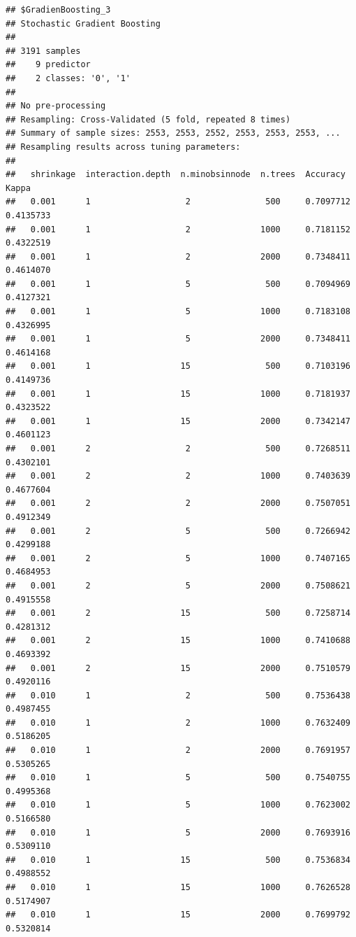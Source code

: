 \documentclass[]{article}
\begin{document}
\begin{lstlisting}
## $GradienBoosting_3
## Stochastic Gradient Boosting 
## 
## 3191 samples
##    9 predictor
##    2 classes: '0', '1' 
## 
## No pre-processing
## Resampling: Cross-Validated (5 fold, repeated 8 times) 
## Summary of sample sizes: 2553, 2553, 2552, 2553, 2553, 2553, ... 
## Resampling results across tuning parameters:
## 
##   shrinkage  interaction.depth  n.minobsinnode  n.trees  Accuracy   Kappa    
##   0.001      1                   2               500     0.7097712  0.4135733
##   0.001      1                   2              1000     0.7181152  0.4322519
##   0.001      1                   2              2000     0.7348411  0.4614070
##   0.001      1                   5               500     0.7094969  0.4127321
##   0.001      1                   5              1000     0.7183108  0.4326995
##   0.001      1                   5              2000     0.7348411  0.4614168
##   0.001      1                  15               500     0.7103196  0.4149736
##   0.001      1                  15              1000     0.7181937  0.4323522
##   0.001      1                  15              2000     0.7342147  0.4601123
##   0.001      2                   2               500     0.7268511  0.4302101
##   0.001      2                   2              1000     0.7403639  0.4677604
##   0.001      2                   2              2000     0.7507051  0.4912349
##   0.001      2                   5               500     0.7266942  0.4299188
##   0.001      2                   5              1000     0.7407165  0.4684953
##   0.001      2                   5              2000     0.7508621  0.4915558
##   0.001      2                  15               500     0.7258714  0.4281312
##   0.001      2                  15              1000     0.7410688  0.4693392
##   0.001      2                  15              2000     0.7510579  0.4920116
##   0.010      1                   2               500     0.7536438  0.4987455
##   0.010      1                   2              1000     0.7632409  0.5186205
##   0.010      1                   2              2000     0.7691957  0.5305265
##   0.010      1                   5               500     0.7540755  0.4995368
##   0.010      1                   5              1000     0.7623002  0.5166580
##   0.010      1                   5              2000     0.7693916  0.5309110
##   0.010      1                  15               500     0.7536834  0.4988552
##   0.010      1                  15              1000     0.7626528  0.5174907
##   0.010      1                  15              2000     0.7699792  0.5320814

\end{lstlisting}
\end{document}
